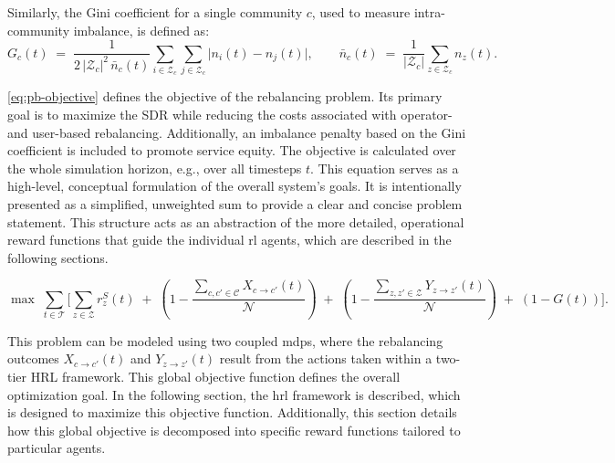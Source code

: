 Similarly, the Gini coefficient for a single community $c$, used to measure intra-community imbalance, is defined as:
\begin{equation}\label{eq:pb-objective-gini-community}
G_c(t) \;=\; 
\frac{1}{2 \, |\mathcal{Z}_c|^2 \, \bar{n}_c(t)} 
\sum_{i \in \mathcal{Z}_c} \sum_{j \in \mathcal{Z}_c} 
\bigl\lvert n_i(t) - n_j(t)\bigr\rvert,
\qquad
\bar{n}_c(t) \;=\; \frac{1}{|\mathcal{Z}_c|} \sum_{z \in \mathcal{Z}_c} n_z(t).
\end{equation}

\autoref{eq:pb-objective} defines the objective of the rebalancing problem.
Its primary goal is to maximize the SDR while reducing the costs associated with operator- and user-based rebalancing.
Additionally, an imbalance penalty based on the Gini coefficient is included to promote service equity.
The objective is calculated over the whole simulation horizon, e.g., over all timesteps $t$.
This equation serves as a high-level, conceptual formulation of the overall system's goals.
It is intentionally presented as a simplified, unweighted sum to provide a clear and concise problem statement.
This structure acts as an abstraction of the more detailed, operational reward functions that guide the individual \gls{rl} agents, which are described in the following sections.

\begin{equation}\label{eq:pb-objective}
\max\;\sum_{t\in \mathcal{T}}\Biggl[
  \sum_{z\in \mathcal{Z}} r^S_z(t)
  \;+\;(1 - \frac{\sum_{c,c' \in \mathcal{C}} X_{c\to c'}(t)}{\mathcal{N}})
  \;+\;(1 - \frac{\sum_{z,z' \in \mathcal{Z}} Y_{z\to z'}(t)}{\mathcal{N}})
  \;+\;(1 - G(t))
\Biggr].
\end{equation}


This problem can be modeled using two coupled \glspl{mdp}, where the rebalancing outcomes $X_{c\rightarrow c'}(t)$ and $Y_{z\rightarrow z'}(t)$ result from the actions taken within a two-tier HRL framework.
This global objective function defines the overall optimization goal.
In the following section, the \gls{hrl} framework is described, which is designed to maximize this objective function.
Additionally, this section details how this global objective is decomposed into specific reward functions tailored to particular agents.

